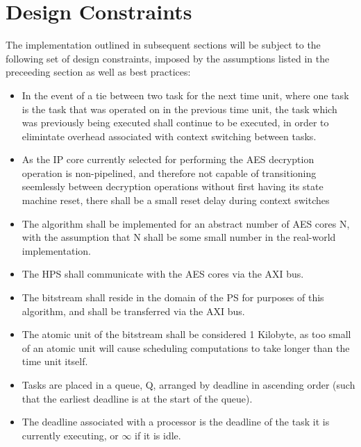 \section{Design Constraints}\label{sec:EDFConstraints}
The implementation outlined in subsequent sections will be subject to the following set of design constraints, imposed by the assumptions listed in the preceeding section as well as best practices:
\begin{itemize}
    \item In the event of a tie between two task for the next time unit, where one task is the task that was operated on in the previous time unit, the task which was previously being executed shall continue to be executed, in order to elimintate overhead associated with context switching between tasks.
    \item As the IP core currently selected for performing the AES decryption operation is non-pipelined, and therefore not capable of transitioning seemlessly between decryption operations without first having its state machine reset, there shall be a small reset delay during context switches
    \item The algorithm shall be implemented for an abstract number of AES cores N, with the assumption that N shall be some small number in the real-world implementation.
    \item The HPS shall communicate with the AES cores via the AXI bus.
    \item The bitstream shall reside in the domain of the PS for purposes of this algorithm, and shall be transferred via the AXI bus.
    \item The atomic unit of the bitstream shall be considered 1 Kilobyte, as too small of an atomic unit will cause scheduling computations to take longer than the time unit itself.
    \item Tasks are placed in a queue, Q, arranged by deadline in ascending order (such that the earliest deadline is at the start of the queue). 
    \item The deadline associated with a processor is the deadline of the task it is currently executing, or $\infty$ if it is idle.
\end{itemize}

